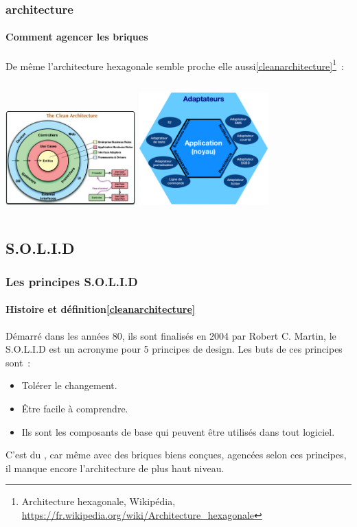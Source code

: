 \documentclass{beamer}
\begin{document}
    \begin{frame}
        \transdissolve
        \frametitle{ architecture}
        \framesubtitle{Comment agencer les briques}
        De même l'architecture hexagonale semble proche elle aussi\cref{cleanarchitecture}\footnotestep\footnote{Architecture hexagonale, Wikipédia, \url{https://fr.wikipedia.org/wiki/Architecture_hexagonale}}~:
        \bigbreak
        \begin{columns}
            \centering
            \includegraphics[width=5cm]{image/the-clean-architecture}
            \centering
            \includegraphics[width=5cm]{image/hexagonal-architecture}
        \end{columns}
    \end{frame}

    \subsection{S.O.L.I.D}\label{subsec:mid-level-solid}


    \begin{frame}
        \transdissolve
        \frametitle{Les principes S.O.L.I.D}
        \framesubtitle{Histoire et définition\cref{cleanarchitecture}}
        Démarré dans les années 80, ils sont finalisés en 2004 par Robert C. Martin, le S.O.L.I.D est un acronyme pour 5 principes de design.
        \bigbreak
        Les buts de ces principes sont~:
        \begin{itemize}
            \item Tolérer le changement.
            \item Être facile à comprendre.
            \item Ils sont les composants de base qui peuvent être utilisés dans tout logiciel.
        \end{itemize}
        \bigbreak
        C'est du , car même avec des briques biens conçues, agencées selon ces principes, il manque encore l'architecture de plus haut niveau.
    \end{frame}
\end{document}
